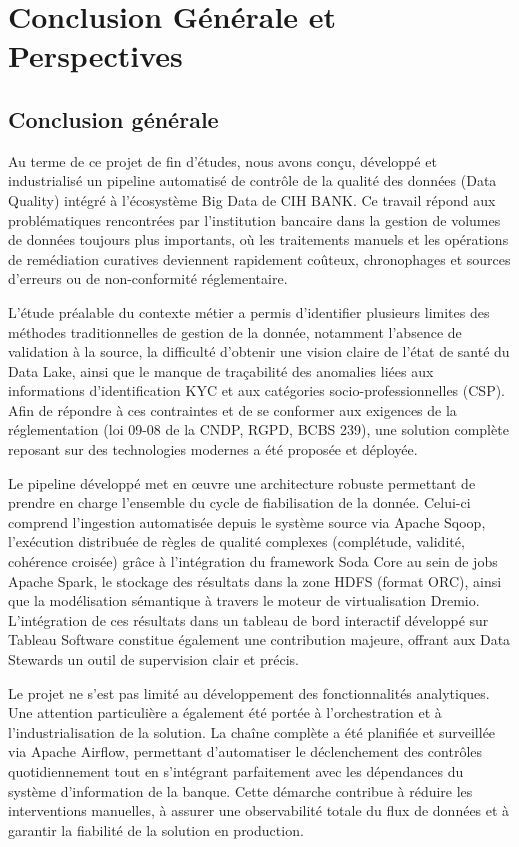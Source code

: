 \chapter*{Conclusion Générale et Perspectives}

\section*{Conclusion générale}
Au terme de ce projet de fin d’études, nous avons conçu, développé et industrialisé un pipeline automatisé de contrôle de la qualité des données (Data Quality) intégré à l'écosystème Big Data de CIH BANK. Ce travail répond aux problématiques rencontrées par l'institution bancaire dans la gestion de volumes de données toujours plus importants, où les traitements manuels et les opérations de remédiation curatives deviennent rapidement coûteux, chronophages et sources d’erreurs ou de non-conformité réglementaire.

L’étude préalable du contexte métier a permis d’identifier plusieurs limites des méthodes traditionnelles de gestion de la donnée, notamment l'absence de validation à la source, la difficulté d'obtenir une vision claire de l'état de santé du Data Lake, ainsi que le manque de traçabilité des anomalies liées aux informations d'identification KYC et aux catégories socio-professionnelles (CSP). Afin de répondre à ces contraintes et de se conformer aux exigences de la réglementation (loi 09-08 de la CNDP, RGPD, BCBS 239), une solution complète reposant sur des technologies modernes a été proposée et déployée.

Le pipeline développé met en œuvre une architecture robuste permettant de prendre en charge l’ensemble du cycle de fiabilisation de la donnée. Celui-ci comprend l'ingestion automatisée depuis le système source via Apache Sqoop, l'exécution distribuée de règles de qualité complexes (complétude, validité, cohérence croisée) grâce à l'intégration du framework Soda Core au sein de jobs Apache Spark, le stockage des résultats dans la zone HDFS (format ORC), ainsi que la modélisation sémantique à travers le moteur de virtualisation Dremio. L'intégration de ces résultats dans un tableau de bord interactif développé sur Tableau Software constitue également une contribution majeure, offrant aux Data Stewards un outil de supervision clair et précis.

Le projet ne s’est pas limité au développement des fonctionnalités analytiques. Une attention particulière a également été portée à l’orchestration et à l’industrialisation de la solution. La chaîne complète a été planifiée et surveillée via Apache Airflow, permettant d'automatiser le déclenchement des contrôles quotidiennement tout en s'intégrant parfaitement avec les dépendances du système d'information de la banque. Cette démarche contribue à réduire les interventions manuelles, à assurer une observabilité totale du flux de données et à garantir la fiabilité de la solution en production.

